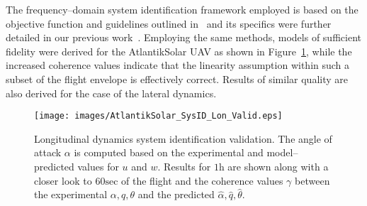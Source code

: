 The frequency--domain system identification framework employed is based on the objective function and guidelines outlined in~\cite{TISCHLER_BOOK} and its specifics were further detailed in our previous work~\cite{Oettershagen_MED14_L1MPC}. Employing the same methods, models of sufficient fidelity were derived for the AtlantikSolar UAV as shown in Figure~\ref{SysID_LonValid}, while the increased coherence values indicate that the linearity assumption within such a subset of the flight envelope is effectively correct. Results of similar quality are also derived for the case of the lateral dynamics. 

%
\begin{figure}[htbp]
\centering
  \texttt{[image: images/AtlantikSolar\_SysID\_Lon\_Valid.eps]}
\caption{Longitudinal dynamics system identification validation. The angle of attack $\alpha$ is computed based on the experimental and model--predicted values for $u$ and $w$. Results for $1\textrm{h}$ are shown along with a closer look to $60\textrm{sec}$ of the flight and the coherence values $\gamma$ between the experimental $\alpha,q,\theta$ and the predicted $\hat{\alpha},\hat{q},\hat{\theta}$. }
\label{SysID_LonValid}
\end{figure}
% 